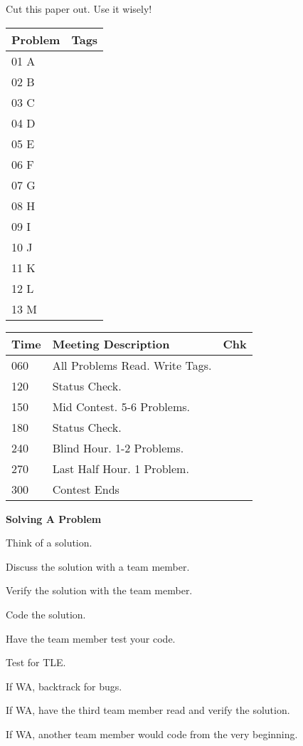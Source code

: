 Cut this paper out. Use it wisely!

\begin{tabular}{| l || m{6cm} | }
	\hline
	\textbf{Problem} & \textbf{Tags}\\	\hline
	01 A & \\	\hline
	02 B & \\	\hline
	03 C & \\	\hline
	04 D & \\	\hline
	05 E & \\	\hline
	06 F & \\	\hline
	07 G & \\	\hline
	08 H & \\	\hline
	09 I & \\	\hline
	10 J & \\	\hline
	11 K & \\	\hline
	12 L & \\	\hline
	13 M & \\	\hline
\end{tabular}
\newline\newline\newline
\begin{tabular}{| l | l || m{7mm}| }
	\hline
	\textbf{Time} & \textbf{Meeting Description} & \textbf{Chk} \\	\hline
	060 & All Problems Read. Write Tags. & 	\\	\hline
	120 & Status Check. &	\\	\hline
	150 & Mid Contest. 5-6 Problems. &	\\	\hline
	180 & Status Check. &	\\	\hline
	240 & Blind Hour. 1-2 Problems. &	\\	\hline
	270 & Last Half Hour. 1 Problem. &	\\	\hline
	300 & Contest Ends &	\\	\hline
\end{tabular}
\newline\newline\newline
\textbf{\large{Solving A Problem}}
\begin{compactitem}
\item Think of a solution.
\item Discuss the solution with a team member.
\item Verify the solution with the team member.
\item Code the solution.
\item Have the team member test your code.
\item Test for TLE.
\item If WA, backtrack for bugs.
\item If WA, have the third team member read and verify the solution.
\item If WA, another team member would code from the very beginning.
\end{compactitem}
